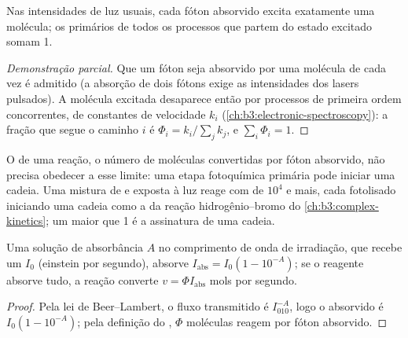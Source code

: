 \begin{proposition}\label{prop:b3:photochemistry:stark-einstein}
Nas intensidades de luz usuais, cada fóton absorvido excita exatamente uma
molécula; os  primários de todos os processos que partem do
estado excitado somam 1.
\end{proposition}

\begin{proof}[Demonstração parcial]
Que um fóton seja absorvido por uma molécula de cada vez é admitido (a absorção
de dois fótons exige as intensidades dos lasers pulsados). A molécula excitada
desaparece então por processos de primeira ordem concorrentes, de constantes de
velocidade $k_i$ (\cref{ch:b3:electronic-spectroscopy}): a fração que segue o
caminho $i$ é $\Phi_i =
k_i/\sum_jk_j$, e $\sum_i\Phi_i = 1$.
\end{proof}

O  de uma reação, o número de moléculas convertidas por fóton
absorvido, não precisa obedecer a esse limite: uma etapa fotoquímica primária
pode iniciar uma cadeia. Uma mistura de  e  exposta à luz reage com
 de $10^4$ e mais, cada  fotolisado iniciando uma
cadeia como a da reação hidrogênio--bromo do \cref{ch:b3:complex-kinetics}; um
 maior que 1 é a assinatura de uma cadeia.

\begin{proposition}\label{prop:b3:photochemistry:rate}
Uma solução de absorbância $A$ no comprimento de onda de irradiação, que recebe um
 $I_0$ (einstein por segundo), absorve $I_{\mathrm{abs}} = I_0(1 - 10^{-A})$; se o
reagente absorve tudo, a reação converte $v = \Phi I_{\mathrm{abs}}$ mols por segundo.
\end{proposition}

\begin{proof}
Pela lei de Beer--Lambert, o fluxo transmitido é $I_010^{-A}$, logo o absorvido é
$I_0(1 - 10^{-A})$; pela definição do , $\Phi$ moléculas reagem por
fóton absorvido.
\end{proof}


